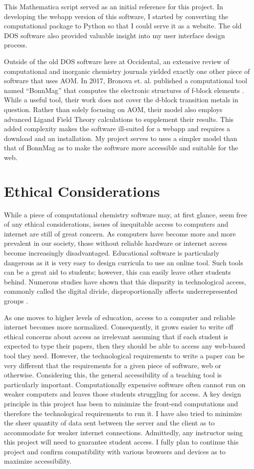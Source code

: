 \documentclass[10pt,twocolumn]{article}
\begin{document}
This Mathematica script served as an initial reference for this project. In developing the webapp version of this software, I started by converting the computational package to Python so that I could serve it as a website. The old DOS software also provided valuable insight into my user interface design process. 

Outside of the old DOS software here at Occidental, an extensive review of computational and inorganic chemistry journals yielded exactly one other piece of software that uses AOM. In 2017, Bronova et. al. published a computational tool named ``BonnMag'' that computes the electronic structures of f-block elements \cite{bronova2018}. While a useful tool, their work does not cover the d-block transition metals in question. Rather than solely focusing on AOM, their model also employs advanced Ligand Field Theory calculations to supplement their results. This added complexity makes the software ill-suited for a webapp and requires a download and an installation. My project serves to uses a simpler model than that of BonnMag as to make the software more accessible and suitable for the web.

\section{Ethical Considerations}
While a piece of computational chemistry software may, at first glance, seem free of any ethical considerations, issues of inequitable access to computers and internet are still of great concern. As computers have become more and more prevalent in our society, those without reliable hardware or internet access become increasingly disadvantaged. Educational software is particularly dangerous as it is very easy to design curricula to use an online tool. Such tools can be a great aid to students; however, this can easily leave other students behind. Numerous studies have shown that this disparity in technological access, commonly called the digital divide, disproportionally affects underrepresented groups \cite{van2006}.

As one moves to higher levels of education, access to a computer and reliable internet becomes more normalized. Consequently, it grows easier to write off ethical concerns about access as irrelevant assuming that if each student is expected to type their papers, then they should be able to access any web-based tool they need. However, the technological requirements to write a paper can be very different that the requirements for a given piece of software, web or otherwise. Considering this, the general accessibility of a teaching tool is particularly important. Computationally expensive software often cannot run on weaker computers and leaves those students struggling for access. A key design principle in this project has been to minimize the front-end computations and therefore the technological requirements to run it. I have also tried to minimize the sheer quantity of data sent between the server and the client as to accommodate for weaker internet connections. Admittedly, any instructor using this project will need to guarantee student access. I fully plan to continue this project and confirm compatibility with various browsers and devices as to maximize accessibility. 
\end{document}
